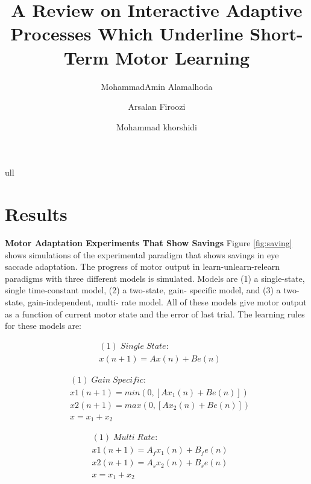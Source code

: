 \documentclass[9pt,twocolumn]{paper-template}
\title{A Review on Interactive Adaptive Processes Which Underline Short-Term Motor Learning}
\author[a]{MohammadAmin Alamalhoda}
\author[a]{Arsalan Firoozi}
\author[a]{Mohammad khorshidi}
\affil[a]{Student, EE Department, Sharif University of Technology}
\begin{document}
\maketitle
\thispagestyle{firststyle}

ull
\\
\section*{Results}


\textbf{Motor Adaptation Experiments That Show Savings}
Figure \ref{fig:saving} shows simulations of the experimental paradigm that shows savings in eye saccade adaptation. The progress of motor output in learn-unlearn-relearn paradigms with three different models is simulated. Models are (1) a single-state, single time-constant model, (2) a two-state, gain- specific model, and (3) a two-state, gain-independent, multi- rate model. All of these models give motor output as a function of current motor state and the error of last trial. The learning rules for these models are:

\begin{eqnarray*}
& (1)\;Single\;State:\\
& x(n+1) = Ax(n)+Be(n)
\end{eqnarray*}

\begin{eqnarray*}
& (1)\;Gain\;Specific:\\
&x1(n+1) = min(0,[Ax_1(n)+Be(n)])\\
&x2(n+1) = max(0,[Ax_2(n)+Be(n)])\\
&x = x_1+x_2
\end{eqnarray*}


\begin{eqnarray*}
& (1)\;Multi\;Rate:\\
& x1(n+1) = A_fx_1(n) + B_fe(n)\\
& x2(n+1) = A_sx_2(n) + B_se(n)\\
&x = x_1+x_2
\end{eqnarray*}
\end{document}
